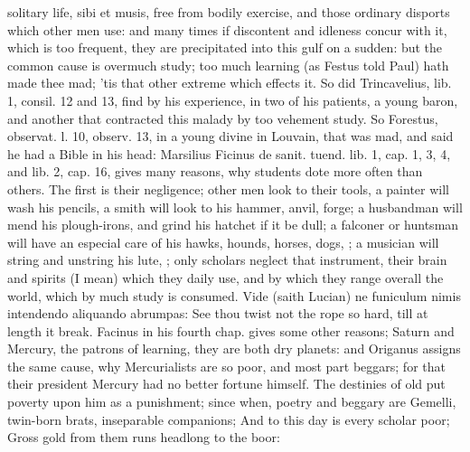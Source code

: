 {solitary life, sibi et musis, free from bodily exercise, and those
ordinary disports which other men use: and many times if discontent and
idleness concur with it, which is too frequent, they are precipitated
into this gulf on a sudden: but the common cause is overmuch study; too
much learning (as Festus told Paul) hath made thee mad; 'tis that
other extreme which effects it. So did Trincavelius, lib. 1, consil. 12
and 13, find by his experience, in two of his patients, a young baron,
and another that contracted this malady by too vehement study. So
Forestus, observat. l. 10, observ. 13, in a young divine in Louvain,
that was mad, and said he had a Bible in his head: Marsilius
Ficinus de sanit. tuend. lib. 1, cap. 1, 3, 4, and lib. 2, cap. 16,
gives many reasons,  why students dote more often than others.
The first is their negligence; other men look to their tools, a
painter will wash his pencils, a smith will look to his hammer, anvil,
forge; a husbandman will mend his plough-irons, and grind his hatchet
if it be dull; a falconer or huntsman will have an especial care of his
hawks, hounds, horses, dogs, \etc{}; a musician will string and unstring
his lute, \etc{}; only scholars neglect that instrument, their brain and
spirits (I mean) which they daily use, and by which they range overall
the world, which by much study is consumed. Vide (saith Lucian) ne
funiculum nimis intendendo aliquando abrumpas: See thou twist not the
rope so hard, till at length it break. Facinus in his fourth
chap. gives some other reasons; Saturn and Mercury, the patrons of
learning, they are both dry planets: and Origanus assigns the same
cause, why Mercurialists are so poor, and most part beggars; for that
their president Mercury had no better fortune himself. The destinies of
old put poverty upon him as a punishment; since when, poetry and
beggary are Gemelli, twin-born brats, inseparable companions;
And to this day is every scholar poor;
Gross gold from them runs headlong to the boor:

}

